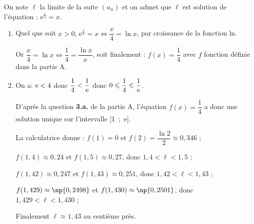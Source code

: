 On note $\ell$ la limite de la suite $\left(u_n\right)$ et on admet que $\ell$ est solution de l'équation :
$\text{e}^{\frac{x}{4}} = x.$

\begin{enumerate}[resume]
\item 
Quel que soit $x > 0$, \:$\text{e}^{\frac{x}{4}} = x \iff \dfrac{x}{4} = \ln x$, par croissance de la fonction ln.

Or $\dfrac{x}{4} = \ln x \iff \dfrac14 = \dfrac{\ln x}{x}$, soit finalement :
$f(x) = \dfrac14$ avec $f$ fonction définie dans la partie A.

\item 

On a: $\text e <4$ donc $\dfrac{1}{4} < \dfrac{1}{\text e}$ donc $0\leqslant \dfrac{1}{4} \leqslant \dfrac{1}{\text e}$.

D'après la question \textbf{3.\:a.} de la partie A, l'équation $f(x) = \dfrac14$ a donc une solution unique sur l'intervalle [1~;~e].

La calculatrice donne : $f(1) = 0$ et $f(2) = \dfrac{\ln 2}{2} \approx 0,346$ ;

$f(1,4) \approx 0,24$ et $f(1,5) \approx 0,27$, donc $1,4 < \ell < 1,5$ ;

$f(1,42) \approx 0,247$ et $f(1,43) \approx 0,251$, donc $1,42 < \ell < 1,43$ ;

$f(1,429) \approx \np{0,2498}$ et $f(1,430) \approx \np{0,2501}$, donc $1,429 < \ell < 1,430$ ;

Finalement $\ell \approx 1,43$ au centième près.
\end{enumerate}

\bigskip
